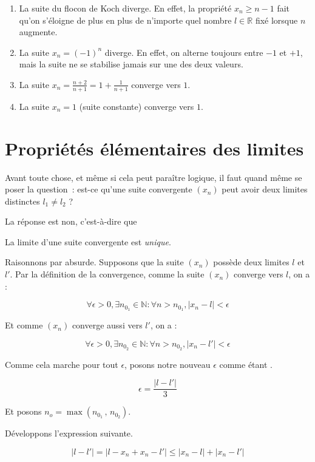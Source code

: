 \begin{enumerate}
    \item La suite du flocon de Koch diverge. En effet, la propriété $x_n \geq n-1$ fait qu'on s'éloigne de plus en plus de n'importe quel nombre $l \in \mathbb R$ fixé lorsque $n$ augmente.
    \item La suite $x_n = (-1)^n$ diverge. En effet, on alterne toujours entre $-1$ et $+1$, mais la suite ne se stabilise jamais sur une des deux valeurs.
    \item La suite $x_n = \frac{n+2}{n+1} = 1 + \frac{1}{n+1}$ converge vers $1$.
    \item La suite $x_n = 1$ (suite constante) converge vers $1$.
\end{enumerate}

\section{Propriétés élémentaires des limites}

Avant toute chose, et même si cela peut paraître logique, il faut quand même se poser la question~: est-ce qu'une suite convergente $(x_n)$ peut avoir deux limites distinctes $l_1 \neq l_2$ ?

La réponse est non, c'est-à-dire que

\begin{boxthm}
La limite d'une suite convergente est \emph{unique}.
\end{boxthm}

Raisonnons par absurde. Supposons que la suite $(x_n)$ possède deux limites $l$ et $l'$.
Par la définition de la convergence, comme la suite $(x_n)$ converge vers $l$, on a :

$$\forall \epsilon > 0 , \exists n_{0_1} \in \mathbb{N} : \forall n > n_{0_1}, \lvert x_n - l \rvert < \epsilon$$

Et comme $(x_n)$ converge aussi vers $l'$, on a :

$$\forall \epsilon > 0 , \exists n_{0_2} \in \mathbb{N} : \forall n > n_{0_2}, \lvert x_n - l' \rvert < \epsilon$$

Comme cela marche pour tout $\epsilon$, posons notre nouveau $\epsilon$ comme étant .

$$\epsilon = \frac{\lvert l-l' \rvert}{3}$$

Et posons $n_o = \max{(n_{0_1} \, , \, n_{0_2})}$.

Développons l'expression suivante.

$$\lvert l-l' \rvert = \lvert l - x_n + x_n - l'\rvert \leq \lvert  x_n - l \rvert + \lvert x_n - l'\rvert$$ 

